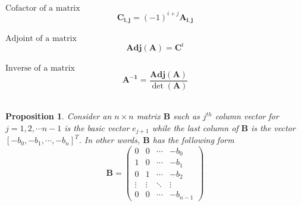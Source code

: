 \documentclass[10pt]{article}
\newtheorem{propo}{Proposition}[section]
\begin{document}
\noindent
$\mbox{Cofactor of a matrix}$ \\
\[ \mathbf{C_{i,j}} = (-1)^{i+j}\mathbf{A_{i,j}} \] \\
$\mbox{Adjoint of a matrix}$ \\
\[ \mathbf{Adj}(\mathbf{A}) = \mathbf{C}^{t} \]  \\
$\mbox{Inverse of a matrix}$ \\
\[ \mathbf{A^{-1}} = \frac{\mathbf{Adj}(\mathbf{A})}{\det(\mathbf{A})} \] \\ 

 
\pagebreak
\begin{propo}
   Consider an $n \times n$ matrix $\mathbf{B}$ such as $j^{th}$ column vector for $j = 1, 2, \cdots n-1$ is the basic vector $e_{j+1}$
   while the last column of $\mathbf{B}$ is the vector $[-b_0, -b_1, \cdots ,-b_n]^{T}$. In other words, $\mathbf{B}$ has the following form \\
    \[
        \mathbf{B} = 
        \begin{pmatrix}
        0 & 0 & \cdots & -b_0 \\
        1 & 0 & \cdots & -b_1 \\
        0 & 1 & \cdots & -b_2 \\
        \vdots  & \vdots  & \ddots & \vdots  \\
        0 & 0 & \cdots & -b_{n-1}
        \end{pmatrix} 
    \]


\end{propo}
\end{document}
